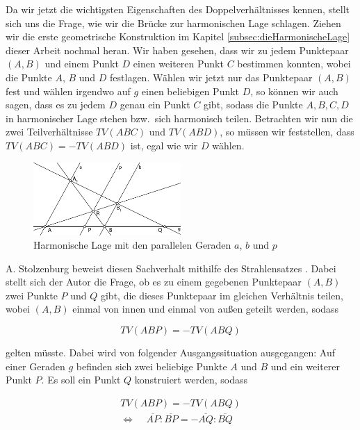 \documentclass[12pt,a4paper]{article}
\begin{document}
Da wir jetzt die wichtigsten Eigenschaften des Doppelverhältnisses kennen, stellt sich uns die Frage, wie wir die Brücke zur harmonischen Lage schlagen. Ziehen wir die erste geometrische Konstruktion im Kapitel \ref{subsec:dieHarmonischeLage} dieser Arbeit nochmal heran. Wir haben gesehen, dass wir zu jedem Punktepaar $(A, B)$ und einem Punkt $D$ einen weiteren Punkt $C$ bestimmen konnten, wobei die Punkte $A$, $B$ und $D$ festlagen. Wählen wir jetzt nur das Punktepaar $(A, B)$ fest und wählen irgendwo auf $g$ einen beliebigen Punkt $D$, so können wir auch sagen, dass es zu jedem $D$ genau ein Punkt $C$ gibt, sodass die Punkte $A, B, C, D$ in harmonischer Lage stehen bzw.~sich harmonisch teilen.
\newline
Betrachten wir nun die zwei Teilverhältnisse $TV(A B C)$ und $TV(A B D)$, so müssen wir feststellen, dass $TV(A B C) = -TV(A B D)$ ist, egal wie wir $D$ wählen.

\begin{figure}[htbp]
\centering
\includegraphics[width=0.5\textwidth]{Bilder/doppelverhaeltnis.png}
\caption{Harmonische Lage mit den parallelen Geraden $a$, $b$ und $p$}
\label{fig:harmonDoppel}
\end{figure}

A. Stolzenburg beweist diesen Sachverhalt mithilfe des Strahlensatzes \citep[vgl.][S.~52]{projektiveGeometrie}. Dabei stellt sich der Autor die Frage, ob es zu einem gegebenen Punktepaar $(A, B)$ zwei Punkte $P$ und $Q$ gibt, die dieses Punktepaar im gleichen Verhältnis teilen, wobei $(A,  B)$ einmal von innen und einmal von außen geteilt werden, sodass

\[TV(A B P) = -TV(A B Q)\]

gelten müsste. Dabei wird von folgender Ausgangssituation ausgegangen: Auf einer Geraden $g$ befinden sich zwei beliebige Punkte $A$ und $B$ und ein weiterer Punkt $P$. Es soll ein Punkt $Q$ konstruiert werden, sodass 

\begin{equation*}
\begin{split}
TV(A B P) = -TV(A B Q) \\
\Longleftrightarrow ~~~~~\overline{A P} : \overline{B P} = -\overline{A Q} : \overline{B Q}~~
\end{split}
\end{equation*}
\end{document}
